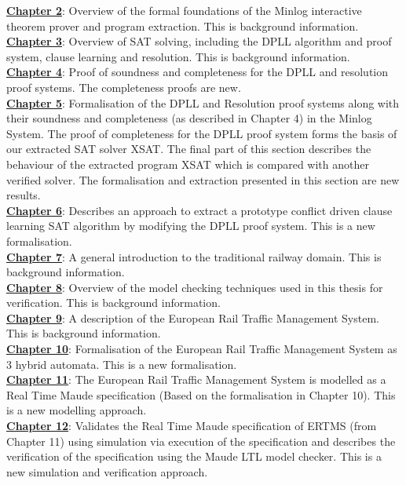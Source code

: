 \textbf{\ul{Chapter 2}}: Overview of the formal foundations of the Minlog interactive theorem prover and program extraction. This is background information.
\medskip \\
\textbf{\ul{Chapter 3}}: Overview of SAT solving, including the DPLL algorithm and  proof system, clause learning and resolution. This is background information.
\medskip \\
\textbf{\ul{Chapter 4}}: Proof of soundness and completeness for the DPLL and resolution proof systems. The completeness proofs are new.
\medskip  \\
\textbf{\ul{Chapter 5}}: Formalisation of the DPLL and Resolution proof systems along with their soundness and completeness (as described in Chapter 4) in the Minlog System. The proof of completeness for the DPLL proof system forms the basis of our extracted SAT solver XSAT. The final part of this section describes the behaviour of the extracted program XSAT which is compared with another verified solver. The formalisation and extraction presented in this section are new results.
\medskip \\ 
\textbf{\ul{Chapter 6}}: Describes an approach to extract a prototype conflict driven clause learning SAT algorithm by modifying the DPLL proof system. This is a new formalisation.
\medskip \\
\textbf{\ul{Chapter 7}}: A general introduction to the traditional railway domain. This is background information.
\medskip \\
\textbf{\ul{Chapter 8}}: Overview of the model checking techniques used in this thesis for verification. This is background information. \medskip \\
\textbf{\ul{Chapter 9}}: A description of the European Rail Traffic Management System. This is background information.
\medskip \\
\textbf{\ul{Chapter 10}}: Formalisation of the European Rail Traffic Management System as 3 hybrid automata. This is a new formalisation.
\medskip \\
\textbf{\ul{Chapter 11}}: The European Rail Traffic Management System is modelled as a Real Time Maude  specification (Based on the formalisation in Chapter 10). This is a new modelling approach.
\medskip \\
\textbf{\ul{Chapter 12}}: Validates the Real Time Maude specification of ERTMS (from Chapter 11) using simulation via execution of the specification and describes the verification of the specification using the Maude LTL model checker. This is a new simulation and verification approach.


